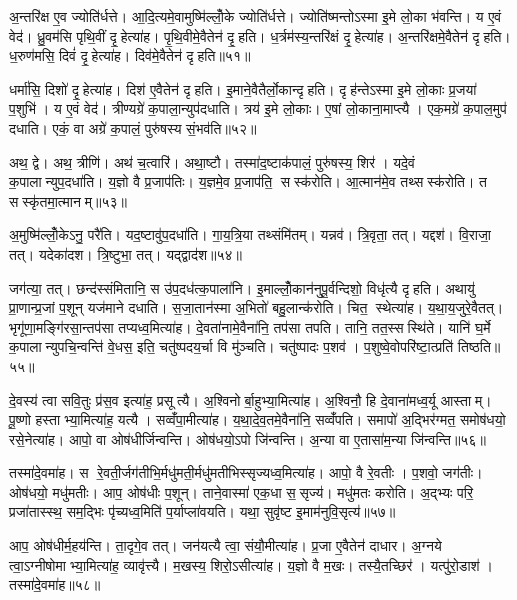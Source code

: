 अ॒न्तरि॑क्ष ए॒व ज्योति॑र्धत्ते। आ॒दि॒त्यमे॒वामुष्मि॑ल्लोँ॒के ज्योति॑र्धत्ते। ज्योति॑ष्मन्तोऽस्मा इ॒मे लो॒का भ॑वन्ति। य ए॒वं वेद॑। ध्रु॒वम॑सि पृथि॒वीं दृ॒हेत्या॑ह। पृ॒थि॒वीमे॒वैतेन॑ दृ॒हति। ध॒र्त्रम॑स्य॒न्तरि॑क्षं दृ॒हेत्या॑ह। अ॒न्तरि॑क्षमे॒वैतेन॑ दृहति। ध॒रुण॑मसि॒ दिवं॑ दृ॒हेत्या॑ह। दिव॑मे॒वैतेन॑ दृहति॥५१॥

धर्मा॑सि॒ दिशो॑ दृ॒हेत्या॑ह। दिश॑ ए॒वैतेन॑ दृहति। इ॒माने॒वैतैर्लो॒कान्दृहति। दृह॑न्तेऽस्मा इ॒मे लो॒काः प्र॒जया॑ प॒शुभि॑। य ए॒वं वेद॑। त्रीण्यग्रे॑ क॒पाला॒न्युप॑दधाति। त्रय॑ इ॒मे लो॒काः। ए॒षां लो॒काना॒माप्त्यै। एक॒मग्रे॑ क॒पाल॒मुप॑ दधाति। एकं॒ वा अग्रे॑ क॒पालं॒ पुरु॑षस्य सं॒भव॑ति॥५२॥

अथ॒ द्वे। अथ॒ त्रीणि॑। अथ॑ च॒त्वारि॑। अथा॒ष्टौ। तस्मा॑द॒ष्टाक॑पालं॒ पुरु॑षस्य॒ शिर॑। यदे॒वं क॒पालान्युप॒दधा॑ति। य॒ज्ञो वै प्र॒जाप॑तिः। य॒ज्ञमे॒व प्र॒जाप॑ति॒ सस्क॑रोति। आ॒त्मान॑मे॒व तथ्सस्क॑रोति। त सस्कृ॑तमा॒त्मानम्॥५३॥

अ॒मुष्मि॑ल्लोँ॒केऽनु॒ परै॑ति। यद॒ष्टावु॑प॒दधा॑ति। गा॒य॒त्रि॒या तथ्संमि॑तम्। यन्नव॑। त्रि॒वृता॒ तत्। यद्दश॑। वि॒राजा॒ तत्। यदेका॑दश। त्रि॒ष्टुभा॒ तत्। यद्द्वाद॑श॥५४॥

जग॑त्या॒ तत्। छन्द॑स्संमितानि॒ स उ॑प॒दध॑त्क॒पाला॑नि। इ॒माल्लोँ॒कान॑नुपू॒र्वन्दिशो॒ विधृ॑त्यै दृहति। अथायु॑ प्रा॒णान्प्र॒जां प॒शून् यज॑माने दधाति। स॒जा॒तान॑स्मा अ॒भितो॑ बहु॒लान्क॑रोति। चित॒ स्थेत्या॑ह। य॒था॒य॒जुरे॒वैतत्। भृगू॑णा॒मङ्गि॑रसा॒न्तप॑सा तप्यध्व॒मित्या॑ह। दे॒वता॑नामे॒वैना॑नि॒ तप॑सा तपति। तानि॒ तत॒स्सस्थि॑ते। यानि॑ घ॒र्मे क॒पालान्युपचि॒न्वन्ति॑ वे॒धस॒ इति॒ चतु॑ष्पदय॒र्चा वि मु॑ञ्चति। चतु॑ष्पादः प॒शव॑। प॒शुष्वे॒वोपरि॑ष्टा॒त्प्रति॑ तिष्ठति॥५५॥\anuvakamend[व॒र्त॒य॒ति॒ दिव॑मे॒वैतेन॑ दृहति स॒म्भव॑ति॒ त सस्कृ॑तमा॒त्मान॒न्द्वाद॑श॒ सस्थि॑ते॒ त्रीणि॑ च]

दे॒वस्य॑ त्वा सवि॒तुः प्र॑स॒व इत्या॑ह॒ प्रसूत्यै। अ॒श्विनोर्बा॒हुभ्या॒मित्या॑ह। अ॒श्विनौ॒ हि दे॒वाना॑मध्व॒र्यू आस्ताम्। पू॒ष्णो हस्ताभ्या॒मित्या॑ह॒ यत्यै। सव्वँ॑पा॒मीत्या॑ह। य॒था॒दे॒व॒तमे॒वैना॑नि॒ सव्वँ॑पति। समापो॑ अ॒द्भिर॑ग्मत॒ समोष॑धयो॒ रसे॒नेत्या॑ह। आपो॒ वा ओष॑धीर्जिन्वन्ति। ओष॑धयो॒ऽपो जि॑न्वन्ति। अ॒न्या वा ए॒तासा॑म॒न्या जि॑न्वन्ति॥५६॥

तस्मा॑दे॒वमा॑ह। स रे॒वती॒र्जग॑तीभि॒र्मधु॑मती॒र्मधु॑मतीभिस्सृज्यध्व॒मित्या॑ह। आपो॒ वै रे॒वतीः। प॒शवो॒ जग॑तीः। ओष॑धयो॒ मधु॑मतीः। आप॒ ओष॑धीः प॒शून्। ताने॒वास्मा॑ एक॒धा स॒सृज्य॑। मधु॑मतः करोति। अ॒द्भ्यः परि॒ प्रजा॑तास्स्थ॒ सम॒द्भिः पृ॑च्यध्व॒मिति॑ प॒र्याप्ला॑वयति। यथा॒ सुवृ॑ष्ट इ॒माम॑नुवि॒सृत्य॑॥५७॥

आप॒ ओष॑धीर्म॒हय॑न्ति। ता॒दृगे॒व तत्। जन॑यत्यै त्वा॒ संयौ॒मीत्या॑ह। प्र॒जा ए॒वैतेन॑ दाधार। अ॒ग्नये त्वा॒ऽग्नीषोमाभ्या॒मित्या॑ह॒ व्यावृ॑त्त्यै। म॒खस्य॒ शिरो॒ऽसीत्या॑ह। य॒ज्ञो वै म॒खः। तस्यै॒तच्छिर॑। यत्पु॑रो॒डाश॑। तस्मा॑दे॒वमा॑ह॥५८॥

